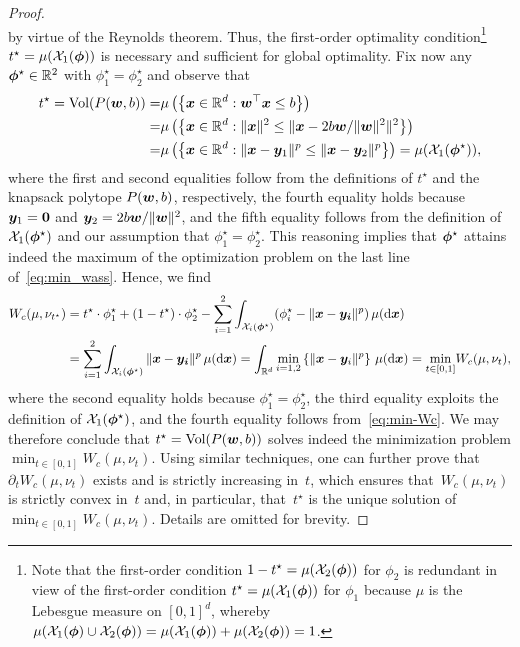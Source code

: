 \documentclass[11pt, a4paper, oneside, reqno]{article}
\begin{document}
\begin{proof}
\[		\]
		by virtue of the Reynolds theorem. Thus, the first-order optimality condition\footnote{Note that the first-order condition $1-t^\star=\mu(\mathcal{X}_2(\boldsymbol \phi))$ for $\phi_2$ is redundant in view of the first-order condition $t^\star=\mu(\mathcal{X}_1(\boldsymbol \phi))$ for $\phi_1$ because $\mu$ is the Lebesgue measure on $[0,1]^d$, whereby $\mu(\mathcal{X}_1(\boldsymbol \phi)\cup\mathcal{X}_2(\boldsymbol \phi))=\mu(\mathcal{X}_1(\boldsymbol \phi))+\mu(\mathcal{X}_2(\boldsymbol \phi))=1$.} $t^\star=\mu(\mathcal{X}_1(\boldsymbol \phi))$ is necessary and sufficient for global optimality. Fix now any $\boldsymbol \phi^\star\in\mathbb{R}^2$ with $\phi^\star_1=\phi^\star_2$ and observe that
		\begin{align*}
		t^\star=\textrm{Vol}(P(\boldsymbol{w}, b)) =& \mu\left(\left\{\boldsymbol x\in\mathbb{R}^d: \boldsymbol w^\top\boldsymbol x\leq b \right\}\right)\\
		=&\mu\left( \left\{\boldsymbol x\in\mathbb{R}^d: \|\boldsymbol x \|^2\leq \|\boldsymbol x-2b \boldsymbol w/\|\boldsymbol w\|^2\|^2 \right\}\right)\\
		=& \mu\left(\left\{\boldsymbol x\in\mathbb{R}^d: \|\boldsymbol x -\boldsymbol y_1\|^p\leq \|\boldsymbol x-\boldsymbol y_2\|^p \right\}\right)=\mu(\mathcal{X}_1(\boldsymbol \phi^\star)),
		\end{align*}
		where the first and second equalities follow from the definitions of $t^\star$ and the knapsack polytope $P(\boldsymbol{w}, b)$, respectively, the fourth equality holds because $\boldsymbol y_1=\boldsymbol 0$ and $\boldsymbol y_2=2b\boldsymbol w/\|\boldsymbol w\|^2$, and the fifth equality follows from the definition of $\mathcal{X}_1(\boldsymbol \phi^\star)$ and our assumption that $\phi^\star_1=\phi^\star_2$. This reasoning implies that $\boldsymbol \phi^\star$ attains indeed the maximum of the optimization problem on the last line of~\eqref{eq:min_wass}. Hence, we find
		\begin{align*}
		W_c(\mu, \nu_ {t^\star} ) &= t^\star \cdot \phi^\star_1   + (1-t^\star)\cdot \phi^\star_2- \sum\limits_{i = 1}^2 \int_{\mathcal{X}_i(\boldsymbol \phi^\star)}(\phi^\star_i - \|\boldsymbol x - \boldsymbol {y_i}\|^p)\,\mu(\mathrm{d} \boldsymbol x)\\
		&= \sum\limits_{i = 1}^2 \int_{\mathcal{X}_i(\boldsymbol \phi^\star)} \|\boldsymbol x - \boldsymbol {y_i}\|^p \,\mu(\mathrm{d} \boldsymbol x) = \int_{\mathbb{R}^d} \min_{i=1,2}\left\{\|\boldsymbol x -\boldsymbol y_i \|^p\right\}\,\mu(\mathrm{d}\boldsymbol x) =\underset{ t  \in [0,1]}{\min}W_c(\mu,  {\nu}_ t ),
		\end{align*}
		where the second equality holds because $\phi^\star_1=\phi^\star_2$, the third equality exploits the definition of $\mathcal{X}_1(\boldsymbol \phi^\star)$, and the fourth equality follows from~\eqref{eq:min-Wc}. We may therefore conclude that $t^\star=\textrm{Vol}(P(\boldsymbol{w}, b))$ solves indeed the minimization problem $\min_{t\in[0,1]} W_c(\mu, \nu_ t )$. {\color{black} Using similar techniques, one can further prove that~$\partial_t W_c(\mu, \nu_t)$ exists and is strictly increasing in~$t$, which ensures that~$W_c(\mu, \nu_t)$ is strictly convex in~$t$ and, in particular, that~$t^\star $ is the unique solution of $\min_{t\in[0,1]} W_c(\mu, \nu_ t )$. Details are omitted for brevity.}
	\end{proof}
\end{document}
